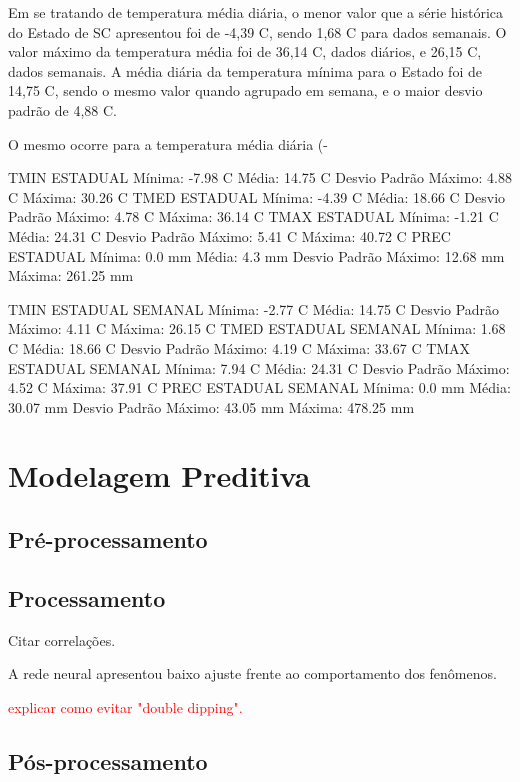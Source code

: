 \indent Em se tratando de temperatura média diária, o menor valor que a série histórica do Estado de \acrshort{SC} apresentou foi de -4,39 C, sendo 1,68 C para dados semanais. O valor máximo da temperatura média foi de 36,14 C, dados diários, e 26,15 C, dados semanais. A média diária da temperatura mínima para o Estado foi de 14,75 C, sendo o mesmo valor quando agrupado em semana, e o maior desvio padrão de 4,88 C. 


O mesmo ocorre para a temperatura média diária (-


TMIN ESTADUAL
Mínima: -7.98 C
Média: 14.75 C
Desvio Padrão Máximo: 4.88 C
Máxima: 30.26 C
TMED ESTADUAL
Mínima: -4.39 C
Média: 18.66 C
Desvio Padrão Máximo: 4.78 C
Máxima: 36.14 C
TMAX ESTADUAL
Mínima: -1.21 C
Média: 24.31 C
Desvio Padrão Máximo: 5.41 C
Máxima: 40.72 C
PREC ESTADUAL
Mínima: 0.0 mm
Média: 4.3 mm
Desvio Padrão Máximo: 12.68 mm
Máxima: 261.25 mm

TMIN ESTADUAL SEMANAL
Mínima: -2.77 C
Média: 14.75 C
Desvio Padrão Máximo: 4.11 C
Máxima: 26.15 C
TMED ESTADUAL SEMANAL
Mínima: 1.68 C
Média: 18.66 C
Desvio Padrão Máximo: 4.19 C
Máxima: 33.67 C
TMAX ESTADUAL SEMANAL
Mínima: 7.94 C
Média: 24.31 C
Desvio Padrão Máximo: 4.52 C
Máxima: 37.91 C
PREC ESTADUAL SEMANAL
Mínima: 0.0 mm
Média: 30.07 mm
Desvio Padrão Máximo: 43.05 mm
Máxima: 478.25 mm

\section{Modelagem Preditiva}

\subsection{Pré-processamento}

\subsection{Processamento}

\indent Citar correlações.

\indent A rede neural apresentou baixo ajuste frente ao comportamento dos fenômenos.

\indent \textcolor{red}{explicar como evitar "double dipping".}

\subsection{Pós-processamento}

